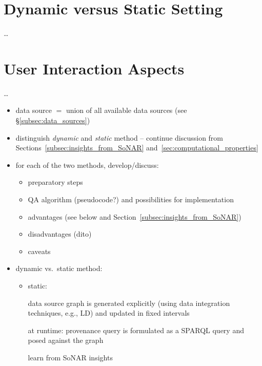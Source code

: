 



\section{Dynamic versus Static Setting}
\label{sec:dynamic_vs_static}

\dots

\section{User Interaction Aspects}
\label{sec:user_interaction}

\dots



\begin{itemize}
  \item
    data source $=$ union of all available data sources (see §\ref{subsec:data_sources})
  \item
    distinguish \emph{dynamic} and \emph{static} method -- continue discussion
    from Sections~\ref{subsec:insights_from_SoNAR} and~\ref{sec:computational_properties}
  \item
    for each of the two methods, develop/discuss:
    \begin{itemize}
      \item
        preparatory steps
      \item
        QA algorithm (pseudocode?) and possibilities for implementation
      \item
        advantages (see below and Section~\ref{subsec:insights_from_SoNAR})
      \item
        disadvantages (dito)
      \item
        caveats
    \end{itemize}
  \item
    dynamic vs.\ static method:
    \begin{itemize}
      \item
        static: 
        
        data source graph is generated explicitly (using data integration techniques, e.g., LD)
        and updated in fixed intervals
                
        at runtime: provenance query is formulated as a \gls{SPARQL} query and posed against the graph
        
        learn from SoNAR insights
        

\end{itemize}
\end{itemize}
